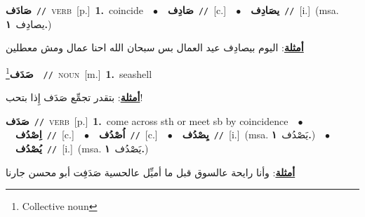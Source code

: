 \documentclass[10pt,a4paper,twoside]{article} %
\begin{document}
\begin{multicols}{2}
{\setlength\topsep{0pt}\textbf{\foreignlanguage{arabic}{صَادَف}}\ {\color{gray}\texttt{//}\color{black}}\ \textsc{verb}\ [p.]\ \textbf{1.}~coincide\ \ $\bullet$\ \ \setlength\topsep{0pt}\textbf{\foreignlanguage{arabic}{صَادِف}}\ {\color{gray}\texttt{//}\color{black}}\ [c.]\ \ $\bullet$\ \ \setlength\topsep{0pt}\textbf{\foreignlanguage{arabic}{يصَادِف}}\ {\color{gray}\texttt{//}\color{black}}\ [i.]\ \color{gray}(msa. \foreignlanguage{arabic}{يصادِف}~\foreignlanguage{arabic}{\textbf{١.}})\color{black}\  \begin{flushright}\color{gray}\foreignlanguage{arabic}{\textbf{\underline{\foreignlanguage{arabic}{أمثلة}}}: اليوم بيصادِف عيد العمال بس سبحان الله احنا عمال ومش معطلين}\end{flushright}\color{black}} \vspace{2mm}

{\setlength\topsep{0pt}\textbf{\foreignlanguage{arabic}{صَدَف}}\footnote{Collective noun}\ \ {\color{gray}\texttt{//}\color{black}}\ \textsc{noun}\ [m.]\ \textbf{1.}~seashell\  \begin{flushright}\color{gray}\foreignlanguage{arabic}{\textbf{\underline{\foreignlanguage{arabic}{أمثلة}}}: بتقدر تجمِّع صَدَف إِذا بتحب!}\end{flushright}\color{black}} \vspace{2mm}

{\setlength\topsep{0pt}\textbf{\foreignlanguage{arabic}{صَدَف}}\ {\color{gray}\texttt{//}\color{black}}\ \textsc{verb}\ [p.]\ \textbf{1.}~come across sth or meet sb by coincidence\ \ $\bullet$\ \ \setlength\topsep{0pt}\textbf{\foreignlanguage{arabic}{اِصْدُف}}\ {\color{gray}\texttt{//}\color{black}}\ [c.]\ \ $\bullet$\ \ \setlength\topsep{0pt}\textbf{\foreignlanguage{arabic}{اُصْدُف}}\ {\color{gray}\texttt{//}\color{black}}\ [c.]\ \ $\bullet$\ \ \setlength\topsep{0pt}\textbf{\foreignlanguage{arabic}{يِصْدُف}}\ {\color{gray}\texttt{//}\color{black}}\ [i.]\ \color{gray}(msa. \foreignlanguage{arabic}{يَصْدُف}~\foreignlanguage{arabic}{\textbf{١.}})\color{black}\ \ $\bullet$\ \ \setlength\topsep{0pt}\textbf{\foreignlanguage{arabic}{يُصْدُف}}\ {\color{gray}\texttt{//}\color{black}}\ [i.]\ \color{gray}(msa. \foreignlanguage{arabic}{يَصْدُف}~\foreignlanguage{arabic}{\textbf{١.}})\color{black}\  \begin{flushright}\color{gray}\foreignlanguage{arabic}{\textbf{\underline{\foreignlanguage{arabic}{أمثلة}}}: وأنا رايحة عالسوق قبل ما أميِّل عالحسية صَدَفِت أبو محسن جارنا}\end{flushright}\color{black}} \vspace{2mm}


\end{multicols}
\end{document}
